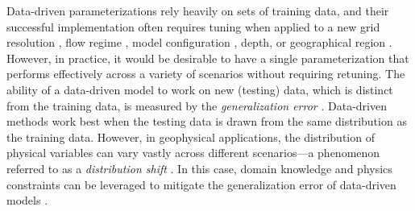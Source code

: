 \documentclass[draft]{agujournal2019}
\begin{document}
Data-driven parameterizations rely heavily on sets of training data, and their successful implementation often requires tuning when applied to a new grid resolution \cite{zhang2023implementation}, flow regime \cite{ross2022benchmarking}, model configuration \cite{perezhogin2024stable}, depth, or geographical region \cite{gultekin2024analysis}. However, in practice, it would be desirable to have a single parameterization that performs effectively across a variety of scenarios without requiring retuning. The ability of a data-driven model to work on new (testing) data, which is distinct from the training data, is measured by the \textit{generalization error} \cite{bishop2006pattern, hastie2009elements}. Data-driven methods work best when the testing data is drawn from the same distribution as the training data. However, in geophysical applications, the distribution of physical variables can vary vastly across different scenarios—a phenomenon referred to as a \textit{distribution shift} \cite{beucler2024climate, gultekin2024analysis}. In this case, domain knowledge and physics constraints can be leveraged to mitigate the generalization error of data-driven models \cite{kashinath2021physics}.



\end{document}
